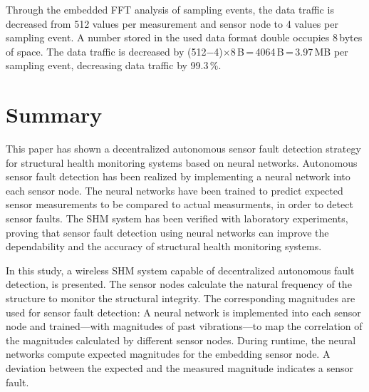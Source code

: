 \documentclass[12pt,a4paper]{scrartcl}
\begin{document}
Through the embedded FFT analysis of sampling events, the data traffic is decreased from 512 values per measurement and sensor node to 4 values per sampling event.
A number stored in the used data format double occupies 8\,bytes of space.
The data traffic is decreased by (512$-$4)$\times$8\,B\,=\,4064\,B\,=\,3.97\,MB per sampling event, decreasing data traffic by 99.3\,\%.


\section*{Summary}

This paper has shown a decentralized autonomous sensor fault detection strategy for structural health monitoring systems based on neural networks. 
Autonomous sensor fault detection has been realized by implementing a neural network into each sensor node.
The neural networks have been trained to predict expected sensor measurements to be compared to actual measurments, in order to detect sensor faults.
The SHM system has been verified with laboratory experiments, proving that sensor fault detection using neural networks can improve the dependability and the accuracy of structural health monitoring systems.

In this study, a wireless SHM system capable of decentralized autonomous fault detection, is presented.
The sensor nodes calculate the natural frequency of the structure to monitor the structural integrity.
The corresponding magnitudes are used for sensor fault detection:
A neural network is implemented into each sensor node and trained---with magnitudes of past vibrations---to map the correlation of the magnitudes calculated by different sensor nodes.
During runtime, the neural networks compute expected magnitudes for the embedding sensor node.
A deviation between the expected and the measured magnitude indicates a sensor fault.





\end{document}
